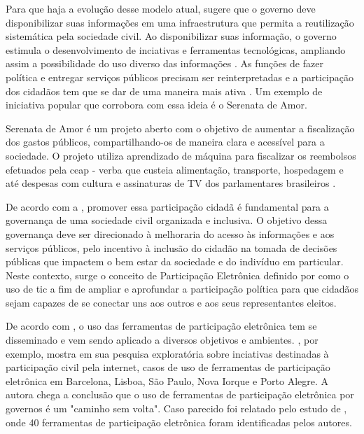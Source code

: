 \par
Para que haja a evolução desse modelo atual,  sugere que o governo deve disponibilizar suas informações em uma infraestrutura que permita a reutilização
sistemática pela sociedade civil. Ao disponibilizar suas informação, o governo estimula o desenvolvimento de inciativas e ferramentas tecnológicas, ampliando assim a possibilidade 
do uso diverso das informações \cite{zuiderwijk2012socio}. As funções de fazer política e entregar serviços públicos precisam ser reinterpretadas e a participação dos cidadãos
tem que se dar de uma maneira mais ativa \cite{bovaird2007beyond}. Um exemplo de iniciativa popular que corrobora com essa ideia é o Serenata de Amor.

\par
Serenata de Amor é um projeto aberto com o objetivo de aumentar a fiscalização dos gastos públicos, compartilhando-os de maneira clara e acessível para a sociedade. O projeto utiliza
aprendizado de máquina para fiscalizar os reembolsos efetuados pela \acrfull{ceap} - verba que custeia alimentação, transporte, hospedagem e até despesas com cultura e 
assinaturas de TV dos parlamentares brasileiros \cite{serenata}. 


\par
De acordo com a , promover essa participação cidadã é fundamental para a governança de uma sociedade civil organizada e inclusiva. O objetivo dessa governança deve
ser direcionado à melhoraria do acesso às informações e aos serviços públicos, pelo incentivo à inclusão do cidadão na tomada de decisões públicas que impactem o bem estar da 
sociedade e do indivíduo em particular.  Neste contexto, surge o conceito de Participação Eletrônica definido por  como o uso de \acrshort{tic}
a fim de ampliar e aprofundar a participação política para que cidadãos sejam capazes de se conectar uns aos outros e aos seus representantes eleitos. 

\par 
De acordo com \cite{medeiros2009novos}, o uso das ferramentas de participação eletrônica tem se disseminado e vem sendo aplicado a diversos objetivos e ambientes. 
, por exemplo, mostra em sua pesquisa exploratória sobre inciativas destinadas à participação civil
pela internet, casos de uso de ferramentas de participação eletrônica em Barcelona, Lisboa, São Paulo, Nova Iorque e Porto Alegre. A autora chega a conclusão 
que o uso de ferramentas de participação eletrônica por governos é um "caminho sem volta". Caso parecido foi relatado pelo estudo de , onde 40 ferramentas
de participação eletrônica foram identificadas pelos autores. 

